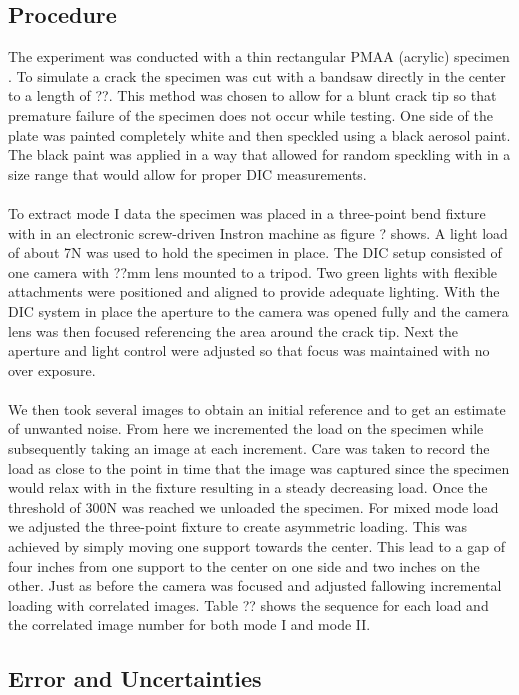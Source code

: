 \documentclass[12pt]{article}
\begin{document}
\subsection{Procedure} %
The experiment was conducted with a thin rectangular PMAA (acrylic) specimen .  To simulate a crack the specimen was cut with a bandsaw directly in the center to a length of ??. This  method was chosen to allow for a blunt crack tip so that premature failure of the specimen does not occur while testing.  One side of the plate was painted  completely white and then speckled using a black aerosol paint.  The black paint was applied in a way that allowed for random speckling with in a size range that would allow for proper DIC measurements.
\\ \\
To extract mode I data the  specimen was placed in a three-point bend fixture with in an electronic screw-driven Instron machine as figure ? shows. A light load of about 7N was used to hold the specimen in place.
The DIC setup consisted of one camera with ??mm lens mounted to a tripod.  Two green lights with flexible attachments were positioned and aligned to provide adequate lighting. With the DIC system in place the aperture to the camera was opened fully and the camera lens was then focused referencing the area around the crack tip. Next the aperture and light control were adjusted so that focus was maintained with no over exposure. 
\\
\\
We then took several images to obtain an initial reference and to get an estimate of unwanted noise. From here we incremented the load on the specimen while subsequently taking an image at each increment. Care was taken to record the load as close to the point in time that the image was captured since the specimen would relax with in the fixture resulting in a steady decreasing load. Once the threshold of 300N was reached we unloaded the specimen.  For mixed mode load we adjusted the three-point fixture to create asymmetric loading. This was achieved by simply moving one support towards the center.  This lead to a gap of four inches from one support to the center on one side and two inches on the other. Just as before the camera was focused and adjusted fallowing incremental loading with correlated images. Table ?? shows the sequence for each load and the correlated image number for both mode I and mode II.  

\subsection{Error and Uncertainties} %
\end{document}
